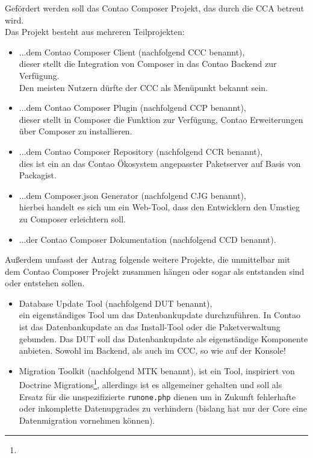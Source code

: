 \documentclass[
paper=a4,
draft=false,%
fontsize=10pt%
]{scrartcl}
\begin{document}
Gefördert werden soll das Contao Composer Projekt, das durch die CCA betreut wird. \\
Das Projekt besteht aus mehreren Teilprojekten:

\begin{itemize}
\item ...dem Contao Composer Client (nachfolgend CCC benannt), \\
dieser stellt die Integration von Composer in das Contao Backend zur Verfügung. \\
Den meisten Nutzern dürfte der CCC als Menüpunkt  bekannt sein.
\item ...dem Contao Composer Plugin (nachfolgend CCP benannt), \\
dieser stellt in Composer die Funktion zur Verfügung, Contao Erweiterungen über Composer zu installieren.
\item ...dem Contao Composer Repository (nachfolgend CCR benannt), \\
dies ist ein an das Contao Ökosystem angepasster Paketserver auf Basis von Packagist.
\item ...dem Composer.json Generator (nachfolgend CJG benannt), \\
hierbei handelt es sich um ein Web-Tool, dass den Entwicklern den Umstieg zu Composer erleichtern soll.
\item ...der Contao Composer Dokumentation (nachfolgend CCD benannt).
\end{itemize}

Außerdem umfasst der Antrag folgende weitere Projekte, die unmittelbar mit dem Contao Composer Projekt zusammen hängen oder sogar als  entstanden sind oder entstehen sollen.

\begin{itemize}
\item Database Update Tool (nachfolgend DUT benannt), \\
ein eigenständiges Tool um das Datenbankupdate durchzuführen. In Contao ist das Datenbankupdate an das Install-Tool oder die Paketverwaltung gebunden. Das DUT soll das Datenbankupdate als eigenständige Komponente anbieten. Sowohl im Backend, als auch im CCC, so wie auf der Konsole!
\item Migration Toolkit (nachfolgend MTK benannt), ist ein Tool, inspiriert von Doctrine Migrations\footnote{}, allerdings ist es allgemeiner gehalten und soll als Ersatz für die unspezifizierte \texttt{runone.php} dienen um in Zukunft fehlerhafte oder inkomplette Datenupgrades zu verhindern (bislang hat nur der Core eine  Datenmigration vornehmen können).
\end{itemize}
\end{document}

